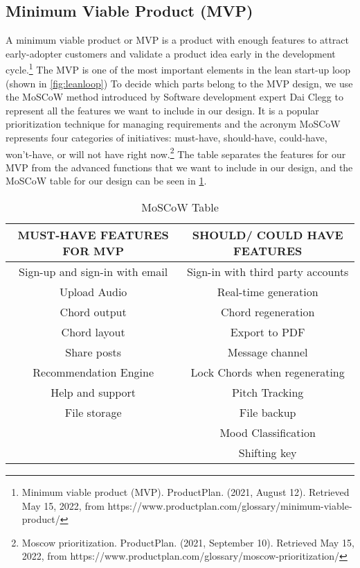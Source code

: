 \subsection{Minimum Viable Product (MVP)}
\label{sec:UImvp}
A minimum viable product or MVP is a product with enough features to attract early-adopter customers and validate a product idea early in the development cycle.\footnote{Minimum viable product (MVP). ProductPlan. (2021, August 12). Retrieved May 15, 2022, from https://www.productplan.com/glossary/minimum-viable-product/} The MVP is one of the most important elements in the lean start-up loop (shown in \cref{fig:leanloop}) 
To decide which parts belong to the MVP design, we use the MoSCoW method introduced by Software development expert Dai Clegg to represent all the features we want to include in our design. It is a popular prioritization technique for managing requirements and the acronym MoSCoW represents four categories of initiatives: must-have, should-have, could-have, won’t-have, or will not have right now.\footnote{Moscow prioritization. ProductPlan. (2021, September 10). Retrieved May 15, 2022, from https://www.productplan.com/glossary/moscow-prioritization/}
The table separates the features for our MVP from the advanced functions that we want to include in our design, and the MoSCoW table for our design can be seen in \cref{moscow}.

\begin{table}[ht]
\centering
\begin{tabular}{ |c|c| } 
 \hline
\textbf{MUST-HAVE FEATURES FOR MVP} & \textbf{SHOULD/ COULD HAVE FEATURES}\\ 
 \hline
 Sign-up and sign-in with email & Sign-in with third party accounts \\ 
 \hline
 Upload Audio & Real-time generation \\ 
 \hline
 Chord output & Chord regeneration \\ 
 \hline
 Chord layout &  Export to PDF \\ 
 \hline
 Share posts & Message channel \\ 
 \hline
 Recommendation Engine &  Lock Chords when regenerating\\ 
 \hline
 Help and support &  Pitch Tracking\\ 
 \hline
 File storage& File backup \\ 
  \hline
 & Mood Classification \\ 
  \hline
 & Shifting key \\ 
 \hline
 \end{tabular}
 \caption{MoSCoW Table}
 \centering
 \label{moscow}
 \end{table}
 
